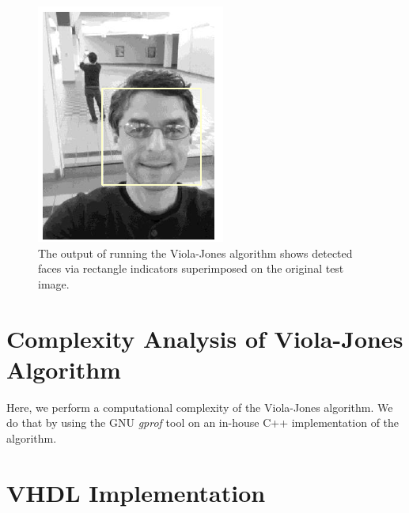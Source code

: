 \documentclass[conference]{IEEEtran}
\begin{document}
\begin{figure}[!htb]
\centering
	\includegraphics[scale=1.0]{fig_face_detection_example}
\caption{The output of running the Viola-Jones algorithm shows detected faces via rectangle indicators superimposed on the original test image.}
\label{fig_face_detection_example}
\end{figure}




\section {Complexity Analysis of Viola-Jones Algorithm}


Here, we perform a computational complexity of the Viola-Jones algorithm.
We do that by using the GNU {\it gprof} tool on an in-house C++ implementation of the algorithm.





\section {VHDL Implementation}
\end{document}
